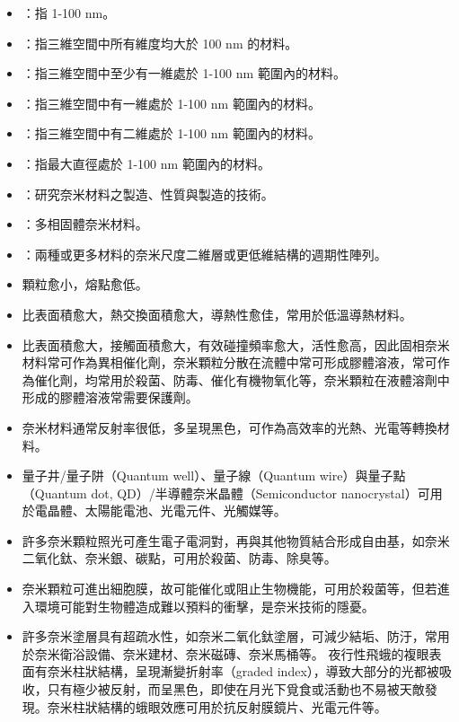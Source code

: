 \documentclass[a4paper,12pt]{report}
\begin{document}
\begin{itemize}
\begin{itemize}
\bit
\item {}：指 1-100 nm。
\item {}：指三維空間中所有維度均大於 100 nm 的材料。
\item {}：指三維空間中至少有一維處於 1-100 nm 範圍內的材料。
\item {}：指三維空間中有一維處於 1-100 nm 範圍內的材料。
\item {}：指三維空間中有二維處於 1-100 nm 範圍內的材料。
\item {}：指最大直徑處於 1-100 nm 範圍內的材料。
\item {}：研究奈米材料之製造、性質與製造的技術。 
\item {}：多相固體奈米材料。
\item {}：兩種或更多材料的奈米尺度二維層或更低維結構的週期性陣列。
\eit
{}
\bit
\item 顆粒愈小，熔點愈低。
\item 比表面積愈大，熱交換面積愈大，導熱性愈佳，常用於低溫導熱材料。
\item 比表面積愈大，接觸面積愈大，有效碰撞頻率愈大，活性愈高，因此固相奈米材料常可作為異相催化劑，奈米顆粒分散在流體中常可形成膠體溶液，常可作為催化劑，均常用於殺菌、防毒、催化有機物氧化等，奈米顆粒在液體溶劑中形成的膠體溶液常需要保護劑。
\item 奈米材料通常反射率很低，多呈現黑色，可作為高效率的光熱、光電等轉換材料。
\item 量子井/量子阱（Quantum well）、量子線（Quantum wire）與量子點（Quantum dot, QD）/半導體奈米晶體（Semiconductor nanocrystal）可用於電晶體、太陽能電池、光電元件、光觸媒等。
\item 許多奈米顆粒照光可產生電子電洞對，再與其他物質結合形成自由基，如奈米二氧化鈦、奈米銀、碳點，可用於殺菌、防毒、除臭等。
\item 奈米顆粒可進出細胞膜，故可能催化或阻止生物機能，可用於殺菌等，但若進入環境可能對生物體造成難以預料的衝擊，是奈米技術的隱憂。
\item 許多奈米塗層具有超疏水性，如奈米二氧化鈦塗層，可減少結垢、防汙，常用於奈米衛浴設備、奈米建材、奈米磁磚、奈米馬桶等。
\eit
{}
夜行性飛蛾的複眼表面有奈米柱狀結構，呈現漸變折射率（graded index），導致大部分的光都被吸收，只有極少被反射，而呈黑色，即使在月光下覓食或活動也不易被天敵發現。奈米柱狀結構的蛾眼效應可用於抗反射膜鏡片、光電元件等。

\end{itemize}
\end{itemize}
\end{document}
